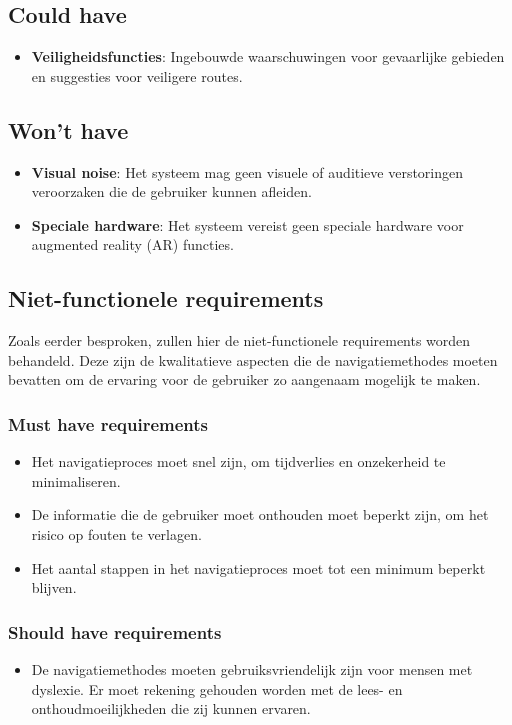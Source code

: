 \subsection*{Could have}
\begin{itemize}[label={--}]
    \item \textbf{Veiligheidsfuncties}: Ingebouwde waarschuwingen voor gevaarlijke gebieden en suggesties voor veiligere routes.
\end{itemize}

\subsection*{Won't have}
\begin{itemize}[label={--}]
    \item \textbf{Visual noise}: Het systeem mag geen visuele of auditieve verstoringen veroorzaken die de gebruiker kunnen afleiden.
    \item \textbf{Speciale hardware}: Het systeem vereist geen speciale hardware voor augmented reality (AR) functies.
\end{itemize}

\subsection{Niet-functionele requirements}
\label{sec:niet-functionele-requirements}

Zoals eerder besproken, zullen hier de niet-functionele requirements worden behandeld. Deze zijn de kwalitatieve aspecten die de navigatiemethodes moeten bevatten om de ervaring voor de gebruiker zo aangenaam mogelijk te maken.

\subsubsection{Must have requirements}
\begin{itemize}
    \item Het navigatieproces moet snel zijn, om tijdverlies en onzekerheid te minimaliseren.
    \item De informatie die de gebruiker moet onthouden moet beperkt zijn, om het risico op fouten te verlagen.
    \item Het aantal stappen in het navigatieproces moet tot een minimum beperkt blijven.
\end{itemize}

\subsubsection{Should have requirements}
\begin{itemize}
    \item De navigatiemethodes moeten gebruiksvriendelijk zijn voor mensen met dyslexie. Er moet rekening gehouden worden met de lees- en onthoudmoeilijkheden die zij kunnen ervaren.
\end{itemize}

